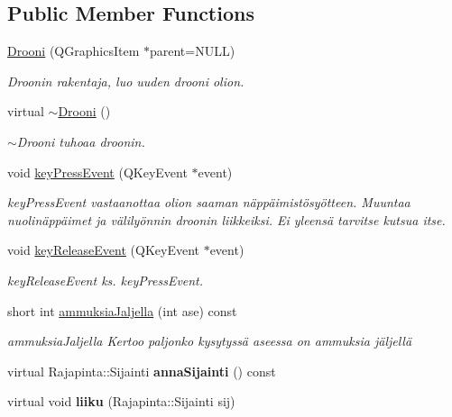 \subsection*{Public Member Functions}
\begin{DoxyCompactItemize}
\item 
\hyperlink{class_drooni_a7198c6e1b9677978754f2b65804cdc6f}{Drooni} (Q\-Graphics\-Item $\ast$parent=N\-U\-L\-L)
\begin{DoxyCompactList}\small\item\em Droonin rakentaja, luo uuden drooni olion. \end{DoxyCompactList}\item 
virtual \hyperlink{class_drooni_a03b2d923119be2c5ee18fc70899aa2d8}{$\sim$\-Drooni} ()
\begin{DoxyCompactList}\small\item\em $\sim$\-Drooni tuhoaa droonin. \end{DoxyCompactList}\item 
void \hyperlink{class_drooni_ae3bbb3da2c280b4281dbcd064c4f23a5}{key\-Press\-Event} (Q\-Key\-Event $\ast$event)
\begin{DoxyCompactList}\small\item\em key\-Press\-Event vastaanottaa olion saaman näppäimistösyötteen. Muuntaa nuolinäppäimet ja välilyönnin droonin liikkeiksi. Ei yleensä tarvitse kutsua itse. \end{DoxyCompactList}\item 
void \hyperlink{class_drooni_a70338cca6bd668a3ef65938d10880ad2}{key\-Release\-Event} (Q\-Key\-Event $\ast$event)
\begin{DoxyCompactList}\small\item\em key\-Release\-Event ks. key\-Press\-Event. \end{DoxyCompactList}\item 
short int \hyperlink{class_drooni_ad825d329b1cb672145a4d01e732e5d1a}{ammuksia\-Jaljella} (int ase) const 
\begin{DoxyCompactList}\small\item\em ammuksia\-Jaljella Kertoo paljonko kysytyssä aseessa on ammuksia jäljellä \end{DoxyCompactList}\item 
\hypertarget{class_drooni_ac814aabc8942f6f3785f985143e66082}{virtual Rajapinta\-::\-Sijainti {\bfseries anna\-Sijainti} () const }\label{class_drooni_ac814aabc8942f6f3785f985143e66082}

\item 
\hypertarget{class_drooni_a1eb6face0d1454af7f6c4386f8cbe456}{virtual void {\bfseries liiku} (Rajapinta\-::\-Sijainti sij)}\label{class_drooni_a1eb6face0d1454af7f6c4386f8cbe456}


\end{DoxyCompactItemize}
